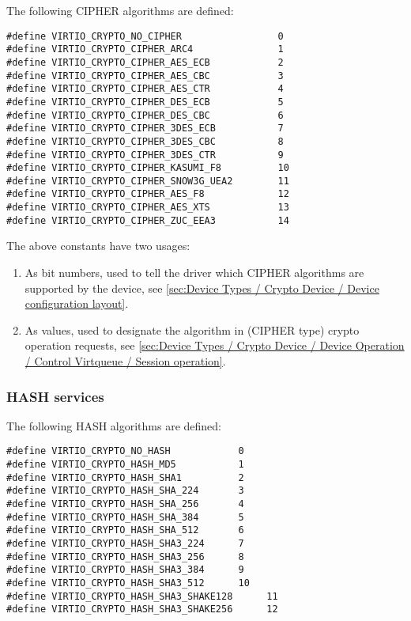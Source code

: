 The following CIPHER algorithms are defined:

\begin{lstlisting}
#define VIRTIO_CRYPTO_NO_CIPHER                 0
#define VIRTIO_CRYPTO_CIPHER_ARC4               1
#define VIRTIO_CRYPTO_CIPHER_AES_ECB            2
#define VIRTIO_CRYPTO_CIPHER_AES_CBC            3
#define VIRTIO_CRYPTO_CIPHER_AES_CTR            4
#define VIRTIO_CRYPTO_CIPHER_DES_ECB            5
#define VIRTIO_CRYPTO_CIPHER_DES_CBC            6
#define VIRTIO_CRYPTO_CIPHER_3DES_ECB           7
#define VIRTIO_CRYPTO_CIPHER_3DES_CBC           8
#define VIRTIO_CRYPTO_CIPHER_3DES_CTR           9
#define VIRTIO_CRYPTO_CIPHER_KASUMI_F8          10
#define VIRTIO_CRYPTO_CIPHER_SNOW3G_UEA2        11
#define VIRTIO_CRYPTO_CIPHER_AES_F8             12
#define VIRTIO_CRYPTO_CIPHER_AES_XTS            13
#define VIRTIO_CRYPTO_CIPHER_ZUC_EEA3           14
\end{lstlisting}

The above constants have two usages:
\begin{enumerate}
\item As bit numbers, used to tell the driver which CIPHER algorithms
are supported by the device, see \ref{sec:Device Types / Crypto Device / Device configuration layout}.
\item As values, used to designate the algorithm in (CIPHER type) crypto
operation requests, see \ref{sec:Device Types / Crypto Device / Device Operation / Control Virtqueue / Session operation}.
\end{enumerate}

\subsubsection{HASH services}\label{sec:Device Types / Crypto Device / Supported crypto services / HASH services}

The following HASH algorithms are defined:

\begin{lstlisting}
#define VIRTIO_CRYPTO_NO_HASH            0
#define VIRTIO_CRYPTO_HASH_MD5           1
#define VIRTIO_CRYPTO_HASH_SHA1          2
#define VIRTIO_CRYPTO_HASH_SHA_224       3
#define VIRTIO_CRYPTO_HASH_SHA_256       4
#define VIRTIO_CRYPTO_HASH_SHA_384       5
#define VIRTIO_CRYPTO_HASH_SHA_512       6
#define VIRTIO_CRYPTO_HASH_SHA3_224      7
#define VIRTIO_CRYPTO_HASH_SHA3_256      8
#define VIRTIO_CRYPTO_HASH_SHA3_384      9
#define VIRTIO_CRYPTO_HASH_SHA3_512      10
#define VIRTIO_CRYPTO_HASH_SHA3_SHAKE128      11
#define VIRTIO_CRYPTO_HASH_SHA3_SHAKE256      12
\end{lstlisting}

